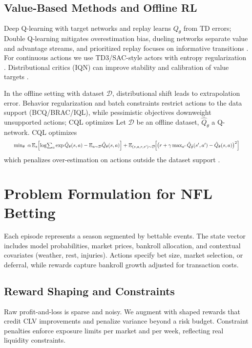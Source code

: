 \subsection{Value-Based Methods and Offline RL}\label{subsec:cql}
Deep Q-learning with target networks and replay learns $Q_\theta$ from TD errors; Double Q-learning mitigates overestimation bias, dueling networks separate value and advantage streams, and prioritized replay focuses on informative transitions \citep{vanhasselt2016,wang2016dueling,schaul2016per}. For continuous actions we use TD3/SAC-style actors with entropy regularization \citep{fujimoto2018td3,haarnoja2018sac}. Distributional critics (IQN) can improve stability and calibration of value targets \citep{bellemare2017distributional,dabney2018quantile}.

In the offline setting with dataset $\mathcal D$, distributional shift leads to extrapolation error. Behavior regularization and batch constraints restrict actions to the data support (BCQ/BRAC/IQL), while pessimistic objectives downweight unsupported actions; CQL optimizes
Let $\mathcal{D}$ be an offline dataset, $\hat Q_\theta$ a Q-network. CQL optimizes
\begin{equation*}
\resizebox{0.96\linewidth}{!}{$
\min_\theta\ \alpha\,\E_s\!\left[\log\!\sum_a \exp\hat Q_\theta(s,a) - \E_{a\sim\mathcal{D}} \hat Q_\theta(s,a)\right]
+ \E_{(s,a,r,s')\sim\mathcal{D}}\!\Big[\big(r+\gamma \max_{a'}\hat Q_{\bar\theta}(s',a')-\hat Q_\theta(s,a)\big)^2\Big]
$}
\end{equation*}
which penalizes over-estimation on actions outside the dataset support \citep{fujimoto2019,kumar2019bear,kumar2020,wu2019brac,kostrikov2021iql,levine2020,agarwal2020offline}.

\section{Problem Formulation for NFL Betting}
Each episode represents a season segmented by bettable events. The state vector includes model probabilities, market prices, bankroll allocation, and contextual covariates (weather, rest, injuries). Actions specify bet size, market selection, or deferral, while rewards capture bankroll growth adjusted for transaction costs.

\subsection{Reward Shaping and Constraints}
Raw profit-and-loss is sparse and noisy. We augment with shaped rewards that credit CLV improvements and penalize variance beyond a risk budget. Constraint penalties enforce exposure limits per market and per week, reflecting real liquidity constraints.

